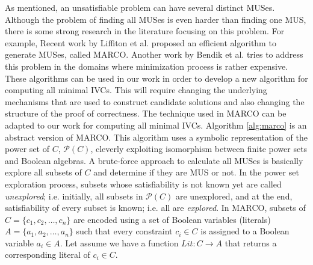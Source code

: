 As mentioned, an unsatisfiable problem can have several distinct MUSes. Although the problem of finding all MUSes is even harder than finding one MUS, there is some strong research in the literature focusing on this problem. For example, Recent work by Liffiton et al. \cite{marco2016fast} proposed an efficient algorithm to generate MUSes, called MARCO.
Another work by Bendik et al. \cite{bendk16} tries to address this problem in the domains where minimization process is rather expensive.
These algorithms can be used in our work in order to develop a new algorithm for computing all minimal IVCs. This will require changing the underlying mechanisms that are used to construct candidate solutions and also changing the structure of the proof of correctness. The technique used in MARCO can be adapted to our work for computing all minimal IVCs. Algorithm \ref{alg:marco} is an abstract version of MARCO. This algorithm uses a symbolic representation of the
power set of $C$, $\mathcal{P} (C)$,  cleverly exploiting isomorphism between finite power sets
and Boolean algebras. 
A brute-force approach to calculate all MUSes is basically explore all subsets of $C$ and determine if they are MUS or not. In the power set exploration process, subsets whose satisfiability is not known
yet are called \emph{unexplored}; i.e. initially, all subsets in $\mathcal{P} (C)$ are unexplored, and at the end, satisfiability of every subset is known; i.e. all are \emph{explored}.
In MARCO, subsets of
 $C = \{c_1 ,c_2 , \dots ,c_n \}$ are encoded using a set of Boolean variables (literals)
$A = \{a_1 ,a_2 , \dots, a_n \}$ such that every constraint $c_i \in C$ is assigned to a Boolean variable $a_i \in A$. Let assume we have a function $Lit: C \rightarrow A$ that returns a corresponding literal of $c_i \in C$.

